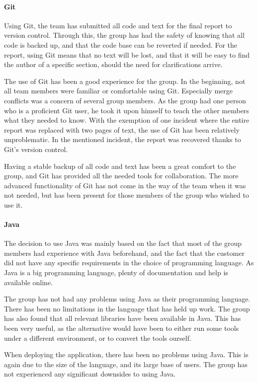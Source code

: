 \documentclass[11pt,a4paper,titlepage,oneside]{report}
\begin{document}
\paragraph{Git}
Using Git, the team has submitted all code and text for the final report to version control. Through this, the group has had the safety of knowing that all code is backed up, and that the code base can be reverted if needed. For the report, using Git means that no text will be lost, and that it will be easy to find the author of a specific section, should the need for clarifications arrive. 

The use of Git has been a good experience for the group. In the beginning, not all team members were familiar or comfortable using Git. Especially merge conflicts was a concern of several group members. As the group had one person who is a proficient Git user, he took it upon himself to teach the other members what they needed to know. With the exemption of one incident where the entire report was replaced with two pages of text, the use of Git has been relatively unproblematic. In the mentioned incident, the report was recovered thanks to Git's version control. 

Having a stable backup of all code and text has been a great comfort to the group, and Git has provided all the needed tools for collaboration. The more advanced functionality of Git has not come in the way of the team when it was not needed, but has been present for those members of the group who wished to use it.

\paragraph{Java}
The decision to use Java was mainly based on the fact that most of the group members had experience with Java beforehand, and the fact that the customer did not have any specific requirements in the choice of programming language. As Java is a big programming language, plenty of documentation and help is available online. 

The group has not had any problems using Java as their programming language. There has been no limitations in the language that has held up work. The group has also found that all relevant libraries have been available in Java. This has been very useful, as the alternative would have been to either run some tools under a different environment, or to convert the tools ourself. 

When deploying the application, there has been no problems using Java. This is again due to the size of the language, and its large base of users. The group has not experienced any significant downsides to using Java. 
\end{document}
